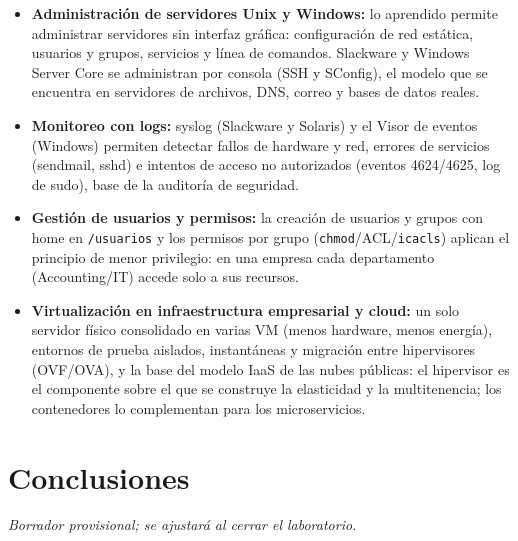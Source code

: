 \documentclass[11pt,a4paper]{report}
\begin{document}
\begin{itemize}
  \item \textbf{Administración de servidores Unix y Windows:} lo aprendido permite administrar servidores sin interfaz gráfica: configuración de red estática, usuarios y grupos, servicios y línea de comandos. Slackware y Windows Server Core se administran por consola (SSH y SConfig), el modelo que se encuentra en servidores de archivos, DNS, correo y bases de datos reales.
  \item \textbf{Monitoreo con logs:} syslog (Slackware y Solaris) y el Visor de eventos (Windows) permiten detectar fallos de hardware y red, errores de servicios (sendmail, sshd) e intentos de acceso no autorizados (eventos 4624/4625, log de sudo), base de la auditoría de seguridad.
  \item \textbf{Gestión de usuarios y permisos:} la creación de usuarios y grupos con home en \texttt{/usuarios} y los permisos por grupo (\texttt{chmod}/ACL/\texttt{icacls}) aplican el principio de menor privilegio: en una empresa cada departamento (Accounting/IT) accede solo a sus recursos.
  \item \textbf{Virtualización en infraestructura empresarial y cloud:} un solo servidor físico consolidado en varias VM (menos hardware, menos energía), entornos de prueba aislados, instantáneas y migración entre hipervisores (OVF/OVA), y la base del modelo IaaS de las nubes públicas: el hipervisor es el componente sobre el que se construye la elasticidad y la multitenencia; los contenedores lo complementan para los microservicios.
\end{itemize}

\section{Conclusiones}

\textit{Borrador provisional; se ajustará al cerrar el laboratorio.}
\end{document}

